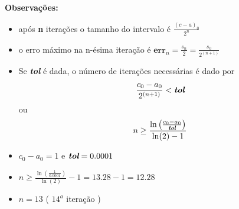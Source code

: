 \textbf{Observações:}

\begin{itemize}
\item após \textbf{n} iterações o tamanho do intervalo é $\displaystyle \frac{(c-a)_{0}}{2^{n}}$

\item o erro máximo na n-ésima iteração é
$\displaystyle \textbf{err}_{n} = \frac{s_{n}}{2} = \frac{s_{0}}{2^{(n+1)}}$

\item Se \textit{\textbf{tol}} é dada, o número de iterações necessárias é dado por
\begin{displaymath}
\displaystyle \frac{c_{0}-a_{0}}{2^{(n+1)}} < \textit{\textbf{tol}}
\end{displaymath}
ou
\begin{displaymath}
n \geq \frac{\ln\left( \frac{c_{0}-a_{0}}{\textit{\textbf{tol}}} \right)}{\ln(2)-1}
\end{displaymath}
\end{itemize}

\begin{example}

\begin{itemize}
\item $ c_{0} - a_{0} = 1$ e $\textit{\textbf{tol}} = 0.0001 $

\item $ n \geq \frac{\ln\left(\frac{1}{0.0001} \right)}{\ln(2)} - 1 = 13.28 - 1 = 12.28 $

\item $n = 13$ ( $14^{a}$ iteração )

\end{itemize}

\end{example}

